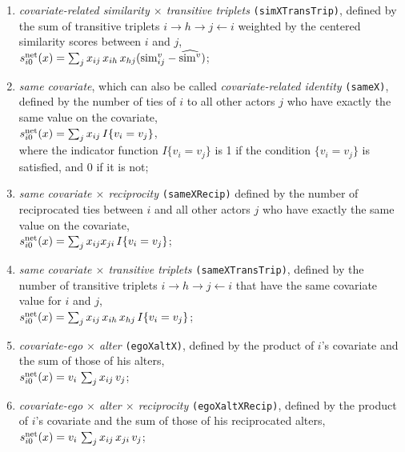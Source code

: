 \documentclass[a4paper,fleqn,11pt]{article}
\newcommand{\+}{\, + \,}
\newcommand{\vit}{\theenumi}
\begin{document}
\begin{enumerate}
 \item {\em covariate-related similarity $\times$ transitive triplets}
 \texttt{(simXTransTrip)}, defined by the sum of transitive triplets
 $i \rightarrow h \rightarrow j \leftarrow i$
 weighted by the centered similarity scores between $i$ and $j$,\\
 $s^{\rm net}_{i\vit}(x) = \sum_j x_{ij}\, x_{ih} \, x_{hj}
         ({\rm sim}^v_{ij} - \widehat{{\rm sim}^v}) $;

 \item \emph{same covariate}, which can also be called {\em covariate-related identity} \texttt{(sameX)},
 defined by the
 number of ties of $i$ to all other actors $j$ who have
 exactly the same value on the covariate,\\
 $s^{\rm net}_{i\vit}(x) = \sum_j x_{ij}\, I\{v_i = v_j \} $,\\
 where the indicator function $I\{v_i = v_j \} $ is 1 if the condition $\{v_i = v_j \} $
 is satisfied, and 0 if it is not;

 \item {\em same covariate $\times$ reciprocity}
\texttt{(sameXRecip)} defined by the
 number of reciprocated ties between $i$ and all other actors $j$ who have
 exactly the same value on the covariate,\\
 $s^{\rm net}_{i\vit}(x) = \sum_j x_{ij} x_{ji}\, I\{v_i = v_j \} $;

 \item {\em same covariate $\times$ transitive triplets}
 \texttt{(sameXTransTrip)}, defined by the number of transitive triplets
 $i \rightarrow h \rightarrow j \leftarrow i$
 that have the same covariate value for $i$ and $j$,\\
 $s^{\rm net}_{i\vit}(x) =
 \sum_j x_{ij}\, x_{ih} \, x_{hj} \, I\{v_i = v_j\}$;

 \item {\em covariate-ego $\times$ alter} \texttt{(egoXaltX)},
 defined by the product of $i$'s covariate and the sum of those of his alters,\\
 $s^{\rm net}_{i\vit}(x) = v_i \, \sum_j x_{ij}\, v_j $;

 \item {\em covariate-ego $\times$ alter $\times$ reciprocity}
 \texttt{(egoXaltXRecip)},
 defined by the product of $i$'s covariate and the sum of those of his reciprocated alters,\\
 $s^{\rm net}_{i\vit}(x) = v_i \, \sum_j x_{ij}\,x_{ji}\, v_j $;

\end{enumerate}
\end{document}
